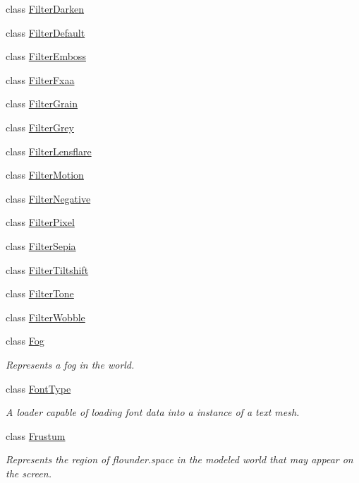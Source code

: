 \begin{DoxyCompactItemize}
\item 
class \hyperlink{class_flounder_1_1_filter_darken}{Filter\+Darken}
\item 
class \hyperlink{class_flounder_1_1_filter_default}{Filter\+Default}
\item 
class \hyperlink{class_flounder_1_1_filter_emboss}{Filter\+Emboss}
\item 
class \hyperlink{class_flounder_1_1_filter_fxaa}{Filter\+Fxaa}
\item 
class \hyperlink{class_flounder_1_1_filter_grain}{Filter\+Grain}
\item 
class \hyperlink{class_flounder_1_1_filter_grey}{Filter\+Grey}
\item 
class \hyperlink{class_flounder_1_1_filter_lensflare}{Filter\+Lensflare}
\item 
class \hyperlink{class_flounder_1_1_filter_motion}{Filter\+Motion}
\item 
class \hyperlink{class_flounder_1_1_filter_negative}{Filter\+Negative}
\item 
class \hyperlink{class_flounder_1_1_filter_pixel}{Filter\+Pixel}
\item 
class \hyperlink{class_flounder_1_1_filter_sepia}{Filter\+Sepia}
\item 
class \hyperlink{class_flounder_1_1_filter_tiltshift}{Filter\+Tiltshift}
\item 
class \hyperlink{class_flounder_1_1_filter_tone}{Filter\+Tone}
\item 
class \hyperlink{class_flounder_1_1_filter_wobble}{Filter\+Wobble}
\item 
class \hyperlink{class_flounder_1_1_fog}{Fog}
\begin{DoxyCompactList}\small\item\em Represents a fog in the world. \end{DoxyCompactList}\item 
class \hyperlink{class_flounder_1_1_font_type}{Font\+Type}
\begin{DoxyCompactList}\small\item\em A loader capable of loading font data into a instance of a text mesh. \end{DoxyCompactList}\item 
class \hyperlink{class_flounder_1_1_frustum}{Frustum}
\begin{DoxyCompactList}\small\item\em Represents the region of flounder.\+space in the modeled world that may appear on the screen. \end{DoxyCompactList}\item 

\end{DoxyCompactItemize}
